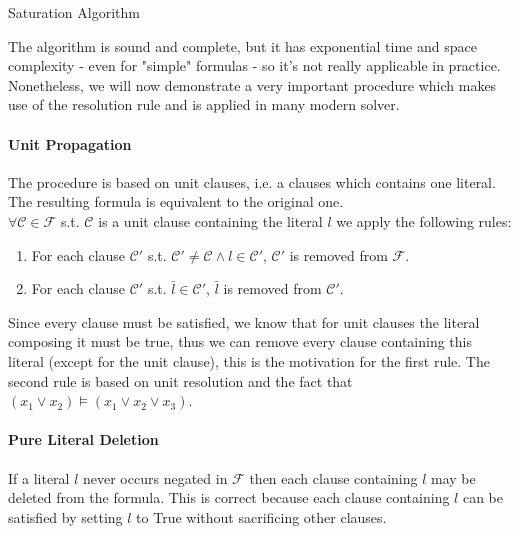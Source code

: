 \documentclass[]{article}
\begin{document}
	\begin{algorithm}[H]
	\caption{Saturation Algorithm}
	\end{algorithm}
	The algorithm is sound and complete, but it has exponential time and space complexity - even for "simple" formulas - so it's not really applicable in practice. Nonetheless, we will now demonstrate a very important procedure which makes use of the resolution rule and is applied in many modern solver.
	\paragraph{Unit Propagation} The procedure is based on unit clauses, i.e. a clauses which contains one literal. The resulting formula is equivalent to the original one.\\
	$\forall \mathcal{C} \in \mathcal{F} $ s.t. $ \mathcal{C} $ is a unit clause containing the literal $l$ we apply the following rules:
	\begin{enumerate}
		\item For each clause $\mathcal{C'} $ s.t. $ \mathcal{C'} \neq \mathcal{C} \land l \in \mathcal{C'} $, $\mathcal{C'} $ is removed from $\mathcal{F} $.
		\item For each clause $\mathcal{C'} $ s.t. $\bar{l} \in \mathcal{C'} $, $\bar{l}$ is removed from $\mathcal{C'} $.
	\end{enumerate}
	Since every clause must be satisfied, we know that for unit clauses the literal composing it must be true, thus we can remove every clause containing this literal (except for the unit clause), this is the motivation for the first rule. The second rule is based on unit resolution and the fact that $ (x_1 \lor x_2) \vDash (x_1 \lor x_2 \lor x_3) $.
	
	\paragraph{Pure Literal Deletion} If a literal $ l $ never occurs negated in $ \mathcal{F} $ then each clause containing $ l $ may be deleted from the formula. This is correct because each clause containing $ l $ can be satisfied by setting $ l $ to True without sacrificing other clauses.
	
\end{document}
